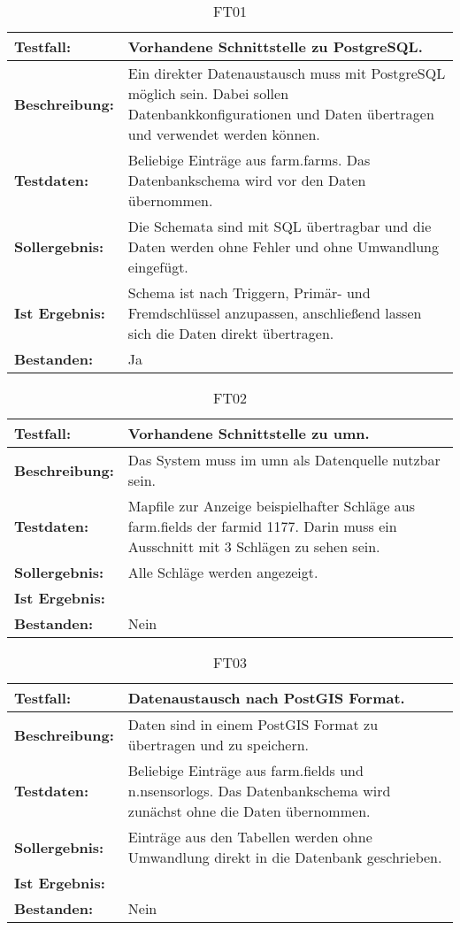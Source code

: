 \label{appendix:funktionstests} 
\capstartfalse
\begin{table}[h!]
\centering
\small
\begin{tabular}{p{2.8cm}|p{12cm}}
\textbf{Testfall:} & Vorhandene Schnittstelle zu PostgreSQL. \\ \hline
\textbf{Beschreibung:} & Ein direkter Datenaustausch muss mit PostgreSQL möglich sein. Dabei sollen Datenbankkonfigurationen und Daten übertragen und verwendet werden können. \\ \hline
\textbf{Testdaten:} & Beliebige Einträge aus farm.farms. Das Datenbankschema wird vor den Daten übernommen. \\ \hline
\textbf{Sollergebnis:} & Die Schemata sind mit SQL übertragbar und die Daten werden ohne Fehler und ohne Umwandlung eingefügt. \\ \hline
\textbf{Ist Ergebnis:} & Schema ist nach Triggern, Primär- und Fremdschlüssel anzupassen, anschließend lassen sich die Daten direkt übertragen. \\ \hline
\textbf{Bestanden:} & Ja \\
\end{tabular}
\caption*{FT01}
\end{table}

\begin{table}[h!]
\centering
\small
\begin{tabular}{p{2.8cm}|p{12cm}}
\textbf{Testfall:} & Vorhandene Schnittstelle zu \Gls{umn}. \\ \hline
\textbf{Beschreibung:} & Das System muss im \Gls{umn} als Datenquelle nutzbar sein. \\ \hline
\textbf{Testdaten:} & Mapfile zur Anzeige beispielhafter Schläge aus farm.fields der farmid 1177. Darin muss ein Ausschnitt mit 3 Schlägen zu sehen sein. \\ \hline
\textbf{Sollergebnis:} & Alle Schläge werden angezeigt. \\ \hline
\textbf{Ist Ergebnis:} &  \\ \hline %
\textbf{Bestanden:} & Nein \\
\end{tabular}
\caption*{FT02}
\end{table}

\begin{table}[h!]
\centering
\small
\begin{tabular}{p{2.8cm}|p{12cm}}
\textbf{Testfall:} & Datenaustausch nach PostGIS Format. \\ \hline
\textbf{Beschreibung:} & Daten sind in einem PostGIS Format zu übertragen und zu speichern. \\ \hline
\textbf{Testdaten:} & Beliebige Einträge aus farm.fields und n.nsensorlogs. Das Datenbankschema wird zunächst ohne die Daten übernommen. \\ \hline
\textbf{Sollergebnis:} & Einträge aus den Tabellen werden ohne Umwandlung direkt in die Datenbank geschrieben. \\ \hline
\textbf{Ist Ergebnis:} &  \\ \hline %
\textbf{Bestanden:} & Nein \\
\end{tabular}
\caption*{FT03}
\end{table}

